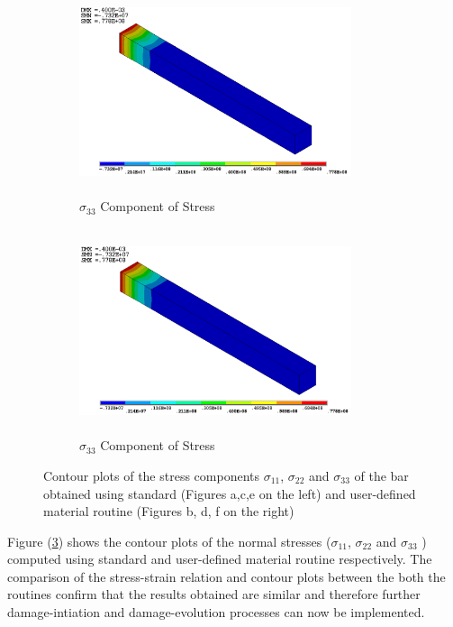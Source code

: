 \documentclass[12pt,openright,twoside]{report}
\begin{document}
\begin{figure}[htbp!]\ContinuedFloat     
     \begin{subfigure}[b]{0.4\textwidth}
         \includegraphics[width=8cm,height=6cm]{17.Ansys_SZ.png}
         \caption{$\sigma_{33}$ Component of Stress}
         \label{fig:Z Component of Stress}
     \end{subfigure}
     \hspace{1.8cm}
     \begin{subfigure}[b]{0.4\textwidth}
         \includegraphics[width=8cm,height=6cm]{20.User_SZ.png}
         \caption{$\sigma_{33}$ Component of Stress}
         \label{fig:Z Component of Stress2}
     \end{subfigure}
        \caption{Contour plots of the stress components $\sigma_{11}$, $\sigma_{22}$ and $\sigma_{33}$ of the bar obtained using standard (Figures a,c,e on the left) and user-defined material routine (Figures b, d, f on the right)}
        \label{fig:USERMAT}     
\end{figure}
\FloatBarrier

Figure (\ref{fig:USERMAT}) shows the contour plots of the normal stresses ($\sigma_{11}$, $\sigma_{22}$ and $\sigma_{33}$ ) computed using standard and user-defined material routine respectively. The comparison of the stress-strain relation and contour plots between the both the routines confirm that the results obtained are similar and therefore further damage-intiation and damage-evolution processes can now be implemented.
\end{document}
